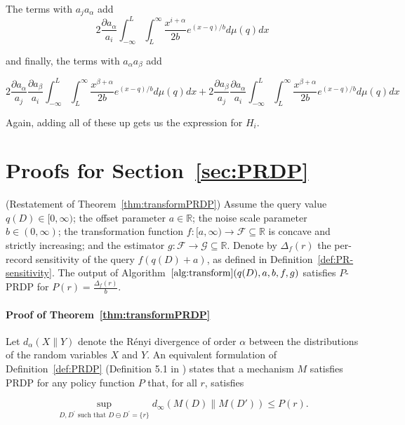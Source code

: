 \documentclass[11pt]{article}
\newcommand{\R}{\mathbb{R}}
\begin{document}
The terms with $a_j a_\alpha$ add
$$2 \frac{\partial a_\alpha}{a_i}\int_{-\infty}^L \int_L^\infty \frac{x^{i+\alpha}}{2b} e^{(x-q)/b} d\mu(q) dx$$

and finally, the terms with $a_\alpha a_\beta$ add

$$2 \frac{\partial a_\alpha}{a_j} \frac{\partial a_\beta}{a_i}\int_{-\infty}^L \int_L^\infty \frac{x^{\beta+\alpha}}{2b} e^{(x-q)/b} d\mu(q) dx + 2 \frac{\partial a_\beta}{a_j} \frac{\partial a_\alpha}{a_i}\int_{-\infty}^L \int_L^\infty \frac{x^{\beta+\alpha}}{2b} e^{(x-q)/b} d\mu(q) dx$$

Again, adding all of these up gets us the expression for $H_i$.


\section{Proofs for Section~\ref{sec:PRDP}}
\label{app:PRDPProofs}

\begin{theorem}(Restatement of Theorem~\ref{thm:transformPRDP})
    Assume the query value $q(D) \in [0,\infty)$; the offset parameter $a \in \R$; the noise scale parameter $b \in (0,\infty)$; the transformation function $f:[a,\infty) \to \mathcal{F} \subseteq \R$ is concave and strictly increasing; and the estimator $g:\mathcal{F} \to \mathcal{G} \subseteq \R$. Denote by $\Delta_f(r)$ the per-record sensitivity of the query $f(q(D) + a)$, as defined in Definition~\ref{def:PR-sensitivity}. The output of Algorithm~$\ref{alg:transform}\allowbreak(q(D), a, b, f, g)$ satisfies $P$-PRDP for $P(r) = \frac{\Delta_f(r)}{b}$.
\end{theorem}

\paragraph{Proof of Theorem~\ref{thm:transformPRDP}}

Let $d_\alpha (X \| Y)$ denote the R\'enyi divergence of order $\alpha$ between the distributions of the random variables $X$ and $Y$. An equivalent formulation of Definition~\ref{def:PRDP} (Definition 5.1 in \cite{finleyEtAl2024}) states that a mechanism $M$ satisfies PRDP for any policy function $P$ that, for all $r$, satisfies

$$\sup_{D,D^\prime \text{ such that } D \ominus D^\prime = \{r\}} d_\infty \left(M(D) \| M(D') \right) \leq P(r).$$
    
\end{document}
